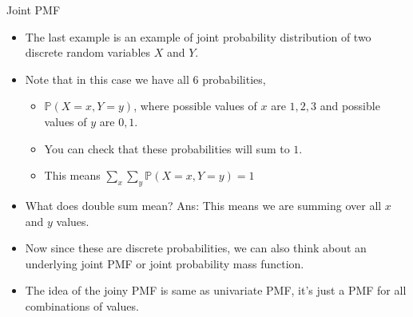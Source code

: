 \documentclass[8pt, usepdftitle=false]{beamer}
\begin{document}
\begin{frame}{Joint PMF}



\begin{itemize}

 \item The last example is an example of \alert{joint probability distribution} of two discrete random variables $X$ and $Y$.

 \item Note that in this case we have all $6$ probabilities,

 \begin{itemize}
   \item $\mathbb{P}(X = x, Y = y)$, where possible values of $x$ are $1, 2, 3$ and possible values of $y$ are $0, 1$.

   \item You can check that these probabilities will sum to $1$.

   \item This means $  \sum_x \sum_y \mathbb{P}(X = x, Y = y)=1$
 \end{itemize}

 \item What does double sum mean? Ans: This means we are summing over all $x$ and $y$ values.

 \item Now since these are discrete probabilities, we can also think about an underlying joint PMF or \alert{joint probability mass function}.

 \item The idea of the joiny PMF is same as univariate PMF, it's just a PMF for all combinations of values.



\end{itemize}


\end{frame}
\end{document}
